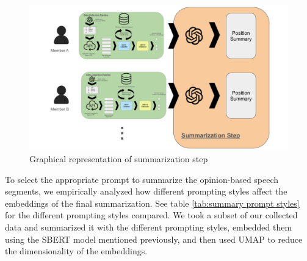 \documentclass[final,5p,times,twocolumn,authoryear]{elsarticle}
\begin{document}
\begin{figure}[h]
\centering
  \centering
  \includegraphics[width=1\linewidth]{figs/summarization.pdf}
  \caption{Graphical representation of summarization step}
  \label{fig:data-summarization}
\end{figure}



To select the appropriate prompt to summarize the opinion-based speech segments, we empirically analyzed how different prompting styles affect the embeddings of the final summarization. See table \ref{tab:summary prompt styles} for the different prompting styles compared. We took a subset of our collected data and summarized it with the different prompting styles, embedded them using the SBERT model mentioned previously, and then used UMAP\citep{mcinnes2018umap-software} to reduce the dimensionality of the embeddings. 
\end{document}

